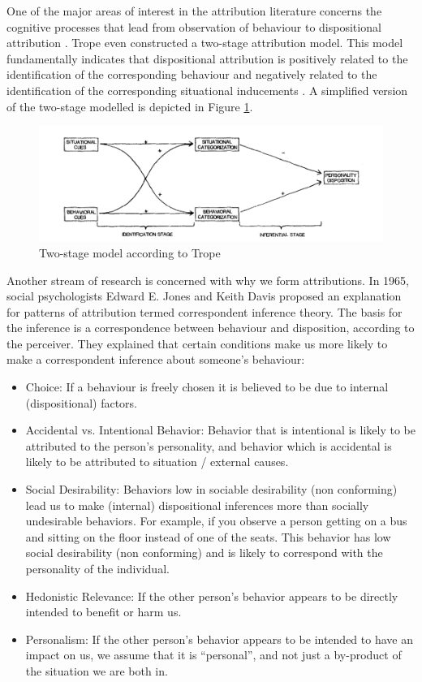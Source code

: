 One of the major areas of interest in the attribution literature concerns the cognitive processes that lead from observation of behaviour to dispositional attribution \cite{Trope1989}. Trope even constructed a two-stage attribution model. This model fundamentally indicates that dispositional attribution is positively related to the identification of the corresponding behaviour and negatively related to the identification of the corresponding situational inducements \cite{Trope1986}. A simplified version of the two-stage modelled is depicted in Figure \ref{fig:twoStageModel}.

\begin{figure}
  \includegraphics[width=\linewidth]{figures/TwoStageModel.png}
  \caption{Two-stage model according to Trope \cite{Trope1986}}
  \label{fig:twoStageModel}
\end{figure}

Another stream of research is concerned with why we form attributions.  In 1965, social psychologists Edward E. Jones and Keith Davis proposed an explanation for patterns of attribution termed correspondent inference theory. The basis for the inference is a correspondence between behaviour and disposition, according to the perceiver. They explained that certain conditions make us more likely to make a correspondent inference about someone's behaviour:

\begin{itemize}
\item Choice: If a behaviour is freely chosen it is believed to be due to internal (dispositional) factors.
\item Accidental vs. Intentional Behavior: Behavior that is intentional is likely to be attributed to the person’s personality, and behavior which is accidental is likely to be attributed to situation / external causes.
\item Social Desirability: Behaviors low in sociable desirability (non conforming) lead us to make (internal) dispositional inferences more than socially undesirable behaviors.  For example, if you observe a person getting on a bus and sitting on the floor instead of one of the seats. This behavior has low social desirability (non conforming) and is likely to correspond with the personality of the individual.
\item Hedonistic Relevance: If the other person’s behavior appears to be directly intended to benefit or harm us. 
\item Personalism: If the other person’s behavior appears to be intended to have an impact on us, we assume that it is “personal”, and not just a by-product of the situation we are both in.
\end{itemize}

